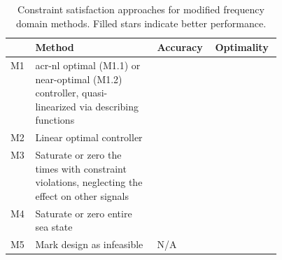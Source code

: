 \begin{table}[htbp]
\centering
\caption[Constraint satisfaction approaches for modified frequency domain methods]{Constraint satisfaction approaches for modified frequency domain methods. Filled stars indicate better performance.}
\label{tab:constraint-approaches}
\begin{tabular}{M{.03\linewidth} >{\raggedright\arraybackslash}m{0.45\linewidth}l l}
&\textbf{Method} & \textbf{Accuracy} & \textbf{Optimality} \\ \toprule
M1 & \gls{acr-nl} optimal (M1.1) or near-optimal (M1.2) controller, quasi-linearized via describing functions&  & \\ \hline
M2 & Linear optimal controller&  &  \\ \hline
M3 & Saturate or zero the times with constraint violations, neglecting the effect on other signals&  & \\ \hline
M4 & Saturate or zero entire sea state&  &  \\ \hline
M5 &Mark design as infeasible& N/A&  \\
\end{tabular}
\end{table}

